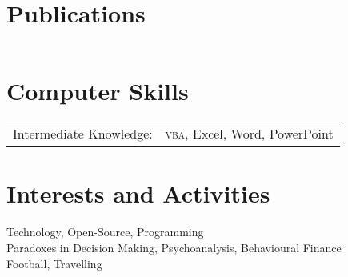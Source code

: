 \documentclass[a4paper,10pt]{article}
\begin{document}
\section{Publications}
\begin{tabular}{rl}

\end{tabular}



\section{Computer Skills}
\begin{tabular}{rl}
Intermediate Knowledge:& \textsc{vba}, Excel, Word, PowerPoint\\
\end{tabular}

\section{Interests and Activities}
Technology, Open-Source, Programming\\
Paradoxes in Decision Making, Psychoanalysis, Behavioural Finance\\
Football, Travelling
\end{document}
